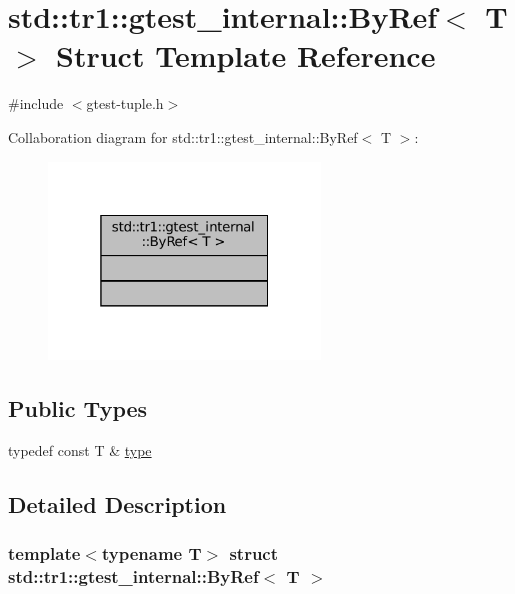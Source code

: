 \hypertarget{structstd_1_1tr1_1_1gtest__internal_1_1ByRef}{}\section{std\+:\+:tr1\+:\+:gtest\+\_\+internal\+:\+:By\+Ref$<$ T $>$ Struct Template Reference}
\label{structstd_1_1tr1_1_1gtest__internal_1_1ByRef}


{\ttfamily \#include $<$gtest-\/tuple.\+h$>$}



Collaboration diagram for std\+:\+:tr1\+:\+:gtest\+\_\+internal\+:\+:By\+Ref$<$ T $>$\+:
\nopagebreak
\begin{figure}[H]
\begin{center}
\leavevmode
\includegraphics[width=205pt]{structstd_1_1tr1_1_1gtest__internal_1_1ByRef__coll__graph}
\end{center}
\end{figure}
\subsection*{Public Types}
\begin{DoxyCompactItemize}
\item 
typedef const T \& \hyperlink{structstd_1_1tr1_1_1gtest__internal_1_1ByRef_ac42ad942ee1cfa86b2abcce9b88ac10e}{type}
\end{DoxyCompactItemize}


\subsection{Detailed Description}
\subsubsection*{template$<$typename T$>$\newline
struct std\+::tr1\+::gtest\+\_\+internal\+::\+By\+Ref$<$ T $>$}



